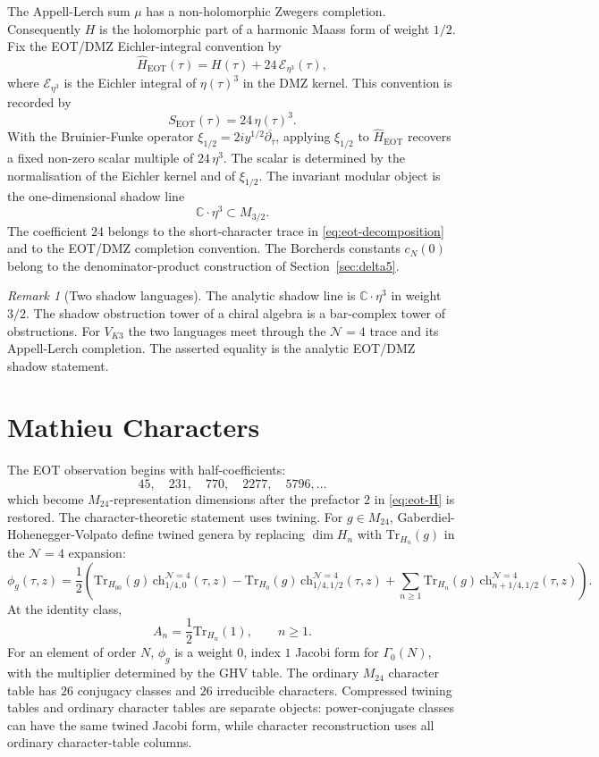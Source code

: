 \documentclass[11pt]{article}
\theoremstyle{definition}
\theoremstyle{remark}
\newtheorem{remark}[theorem]{Remark}
\newcommand{\CC}{\mathbb{C}}
\newcommand{\Tr}{\mathrm{Tr}}
\newcommand{\ch}{\mathrm{ch}}
\begin{document}
The Appell-Lerch sum \(\mu\) has a non-holomorphic Zwegers completion.
Consequently \(H\) is the holomorphic part of a harmonic Maass form of
weight \(1/2\).  Fix the EOT/DMZ Eichler-integral convention by
\[
  \widehat H_{\mathrm{EOT}}(\tau)
  =
  H(\tau)+24\,\mathcal E_{\eta^3}(\tau),
\]
where \(\mathcal E_{\eta^3}\) is the Eichler integral of
\(\eta(\tau)^3\) in the DMZ kernel.  This convention is recorded by
\[
  S_{\mathrm{EOT}}(\tau)=24\,\eta(\tau)^3.
\]
With the Bruinier-Funke operator
\(\xi_{1/2}=2iy^{1/2}\overline{\partial_{\bar\tau}}\), applying
\(\xi_{1/2}\) to \(\widehat H_{\mathrm{EOT}}\) recovers a fixed non-zero
scalar multiple of \(24\,\eta^3\).  The scalar is determined by the
normalisation of the Eichler kernel and of \(\xi_{1/2}\).  The invariant
modular object is the one-dimensional shadow line
\[
  \CC\cdot\eta^3 \subset M_{3/2}.
\]
The coefficient \(24\) belongs to the short-character trace in
\eqref{eq:eot-decomposition} and to the EOT/DMZ completion convention.
The Borcherds constants \(c_N(0)\) belong to the denominator-product
construction of Section~\ref{sec:delta5}.

\begin{remark}[Two shadow languages]
\label{rem:two-shadow-languages}
The analytic shadow line is \(\CC\cdot\eta^3\) in weight \(3/2\).  The
shadow obstruction tower of a chiral algebra is a bar-complex tower of
obstructions.  For \(V_{K3}\) the two languages meet through the
\(\mathcal N=4\) trace and its Appell-Lerch completion.  The asserted
equality is the analytic EOT/DMZ shadow statement.
\end{remark}

\section{Mathieu Characters}
\label{sec:mathieu-characters}

The EOT observation begins with half-coefficients:
\[
  45,\quad 231,\quad 770,\quad 2277,\quad 5796,\ldots
\]
which become \(M_{24}\)-representation dimensions after the prefactor
\(2\) in \eqref{eq:eot-H} is restored.  The character-theoretic
statement uses twining.  For \(g\in M_{24}\),
Gaberdiel-Hohenegger-Volpato define twined genera by replacing
\(\dim H_n\) with \(\Tr_{H_n}(g)\) in the \(\mathcal N=4\) expansion:
\[
  \phi_g(\tau,z)
  =
  \frac12\left(
    \Tr_{H_{00}}(g)\,\ch_{1/4,0}^{\mathcal N=4}(\tau,z)
    -
    \Tr_{H_0}(g)\,\ch_{1/4,1/2}^{\mathcal N=4}(\tau,z)
    +
    \sum_{n\geq 1}\Tr_{H_n}(g)\,
       \ch_{n+1/4,1/2}^{\mathcal N=4}(\tau,z)
  \right).
\]
At the identity class,
\[
  A_n=\frac12\Tr_{H_n}(1),\qquad n\geq 1.
\]
For an element of order \(N\), \(\phi_g\) is a weight \(0\), index \(1\)
Jacobi form for \(\Gamma_0(N)\), with the multiplier determined by the
GHV table.  The ordinary \(M_{24}\) character table has \(26\) conjugacy
classes and \(26\) irreducible characters.  Compressed twining tables
and ordinary character tables are separate objects: power-conjugate
classes can have the same twined Jacobi form, while character
reconstruction uses all ordinary character-table columns.
\end{document}
